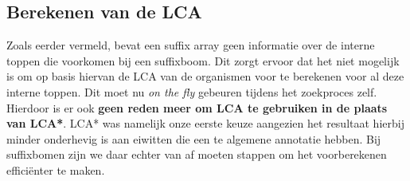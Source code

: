 \subsection{Berekenen van de LCA}\label{subsec:berekenen-van-de-lca}
Zoals eerder vermeld, bevat een suffix array geen informatie over de interne toppen die voorkomen bij een suffixboom.
Dit zorgt ervoor dat het niet mogelijk is om op basis hiervan de LCA van de organismen voor te berekenen voor al deze interne toppen.
Dit moet nu \textit{on the fly} gebeuren tijdens het zoekproces zelf.
Hierdoor is er ook \textbf{geen reden meer om LCA te gebruiken in de plaats van LCA*}.
LCA* was namelijk onze eerste keuze aangezien het resultaat hierbij minder onderhevig is aan eiwitten die een te algemene annotatie hebben.
Bij suffixbomen zijn we daar echter van af moeten stappen om het voorberekenen efficiënter te maken.


